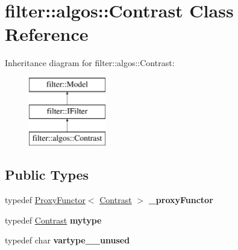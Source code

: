 \hypertarget{classfilter_1_1algos_1_1_contrast}{}\section{filter\+:\+:algos\+:\+:Contrast Class Reference}
\label{classfilter_1_1algos_1_1_contrast}
Inheritance diagram for filter\+:\+:algos\+:\+:Contrast\+:\begin{figure}[H]
\begin{center}
\leavevmode
\includegraphics[height=3.000000cm]{d8/d7f/classfilter_1_1algos_1_1_contrast}
\end{center}
\end{figure}
\subsection*{Public Types}
\begin{DoxyCompactItemize}
\item 
\mbox{\label{classfilter_1_1algos_1_1_contrast_a8f10e6b1f878a4e3c7fd932617099fc5}} 
typedef \hyperlink{class_proxy_functor}{Proxy\+Functor}$<$ \hyperlink{classfilter_1_1algos_1_1_contrast}{Contrast} $>$ {\bfseries \+\_\+proxy\+Functor}
\item 
\mbox{\label{classfilter_1_1algos_1_1_contrast_aee7b92121d7d92aac068510ca1926d15}} 
typedef \hyperlink{classfilter_1_1algos_1_1_contrast}{Contrast} {\bfseries mytype}
\item 
\mbox{\label{classfilter_1_1algos_1_1_contrast_ad98354d1bb5d645be6ad7f65bebfbcec}} 
typedef char {\bfseries vartype\+\_\+\+\_\+unused}
\end{DoxyCompactItemize}

